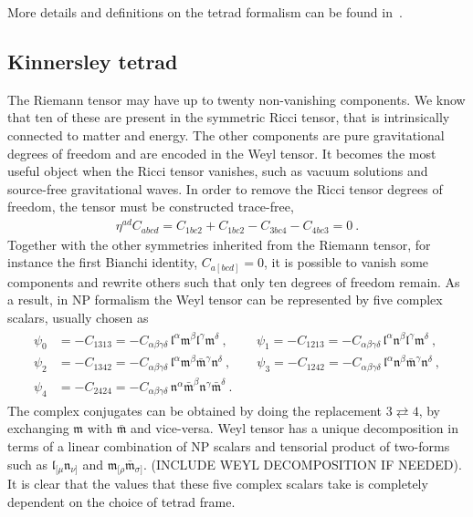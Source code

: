 More details and definitions on the tetrad formalism can be found in~.

\subsection{Kinnersley tetrad}

The Riemann tensor may have up to twenty non-vanishing components.
We know that ten of these are present in the symmetric Ricci tensor, that is intrinsically connected to matter and energy.
The other components are pure gravitational degrees of freedom and are encoded in the Weyl tensor.
It becomes the most useful object when the Ricci tensor vanishes, such as vacuum solutions and source-free gravitational waves.
In order to remove the Ricci tensor degrees of freedom, the tensor must be constructed trace-free,
\begin{align}
    \eta^{ad} C_{abcd} = C_{1bc2} + C_{1bc2} - C_{3bc4} - C_{4bc3} = 0 ~. 
\end{align}
Together with the other symmetries inherited from the Riemann tensor, for instance the first Bianchi identity, $C_{a[bcd]}=0$, it is possible to vanish some components and rewrite others such that only ten degrees of freedom remain.
As a result, in NP formalism the Weyl tensor can be represented by five complex scalars, usually chosen as
\begin{align}
    \begin{split}
        \psi_0 &= - C_{1313} = - C_{\alpha\beta\gamma\delta}\, \mathfrak{l}^\alpha \mathfrak{m}^\beta \mathfrak{l}^\gamma \mathfrak{m}^\delta ~,\qquad
        ~\psi_1 = - C_{1213} = - C_{\alpha\beta\gamma\delta}\, \mathfrak{l}^\alpha \mathfrak{n}^\beta \mathfrak{l}^\gamma \mathfrak{m}^\delta ~,\\
        \psi_2 &= - C_{1342} = - C_{\alpha\beta\gamma\delta}\, \mathfrak{l}^\alpha \mathfrak{m}^\beta \bar{\mathfrak{m}}^\gamma \mathfrak{n}^\delta ~,\qquad
        \psi_3 = - C_{1242} = - C_{\alpha\beta\gamma\delta}\, \mathfrak{l}^\alpha \mathfrak{n}^\beta \bar{\mathfrak{m}}^\gamma \mathfrak{n}^\delta ~,\\
        \psi_4 &= - C_{2424} = - C_{\alpha\beta\gamma\delta}\, \mathfrak{n}^\alpha \bar{\mathfrak{m}}^\beta \mathfrak{n}^\gamma \bar{\mathfrak{m}}^\delta ~.
    \end{split}
\end{align}
The complex conjugates can be obtained by doing the replacement $3 \rightleftarrows 4$, by exchanging $\bm{\mathfrak{m}}$ with $\bar{\bm{\mathfrak{m}}}$ and vice-versa. 
Weyl tensor has a unique decomposition in terms of a linear combination of NP scalars and tensorial product of two-forms such as $\mathfrak{l}_{[\mu} \mathfrak{n}_{\nu]}$ and $\mathfrak{m}_{[\rho} \bar{\mathfrak{m}}_{\sigma]}$.
(INCLUDE WEYL DECOMPOSITION IF NEEDED).
It is clear that the values that these five complex scalars take is completely dependent on the choice of tetrad frame. 


